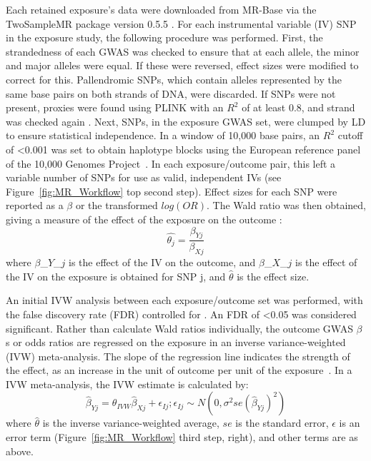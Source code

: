 \documentclass[genes,article,accept,moreauthors,pdftex]{Definitions/mdpi}
\begin{document}
Each retained exposure's data were downloaded from MR-Base via the TwoSampleMR package version 0.5.5 \cite{hemani_mr-base_2018}. For each instrumental variable (IV) SNP in the exposure study, the following procedure was performed. First, the strandedness of each GWAS was checked to ensure that at each allele, the minor and major alleles were equal. If these were reversed, effect sizes were modified to correct for this. Pallendromic SNPs, which contain alleles represented by the same base pairs on both strands of DNA, were discarded. If SNPs were not present, proxies were found using PLINK with an $R^2$ of at least 0.8, and strand was checked again \cite{chang_second-generation_2015}. Next, SNPs, in the exposure GWAS set, were clumped by LD to ensure statistical independence. In a window of 10,000 base pairs, an $R^2$ cutoff of <0.001 was set to obtain haplotype blocks using the European reference panel of the 10,000 Genomes Project~\cite{huang_improved_2015}. In each exposure/outcome pair, this left a variable number of SNPs for use as valid, independent IVs (see Figure~\ref{fig:MR_Workflow} top second step). Effect sizes for each SNP were reported as a $\beta$ or the transformed $log(OR)$. The Wald ratio was then obtained, giving a measure of the effect of the exposure on the outcome \cite{rasooly_conducting_2019}: 
\begin{equation}
\widehat{\theta_j}    = \frac{\beta_{Yj}}{\beta_{Xj}}
\end{equation}
where $\beta$\_$Y$\_$j$ is the effect of the IV on the outcome, and $\beta$\_$X$\_$j$ is the effect of the IV on the exposure is obtained for SNP j, and $\widehat{\theta}$ is the effect size.

An initial IVW analysis between each exposure/outcome set was performed, with the false discovery rate (FDR) controlled for \cite{benyamin_family-based_2009}. An FDR of <0.05 was considered significant. Rather than calculate Wald ratios individually, the outcome GWAS $\beta$s or odds ratios are regressed on the exposure in an inverse variance-weighted (IVW) meta-analysis. The slope of the regression line indicates the strength of the effect, as an increase in the unit of outcome per unit of the exposure~\cite{burgess_interpreting_2017}. 
In a IVW meta-analysis, the  IVW estimate is calculated by:
\begin{equation}
\widehat{\beta}_{Yj} = \theta_{IVW}\widehat{\beta}_{Xj} + \epsilon_{Ij};      \epsilon_{Ij} \sim N(0,\sigma^2se(\widehat{\beta}_{Yj})^2)
\end{equation}
where $\widehat{\theta}$ is the inverse variance-weighted average, $se$ is the standard error, {$\epsilon$} is an error term (Figure~\ref{fig:MR_Workflow} third step, right), and other terms are as above.
\end{document}
